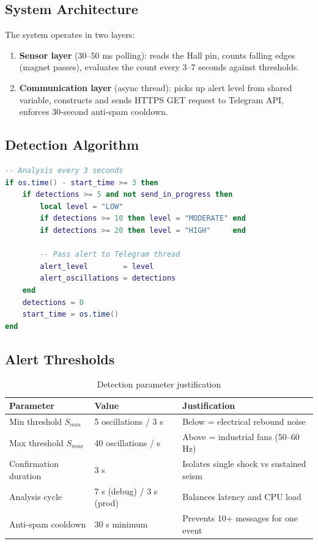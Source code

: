 \documentclass[11pt,a4paper]{article}
\begin{document}
\subsection{System Architecture}

The system operates in two layers:

\begin{enumerate}[noitemsep]
  \item \textbf{Sensor layer} (30--50 ms polling): reads the Hall pin, counts falling edges (magnet passes), evaluates the count every 3--7 seconds against thresholds.
  \item \textbf{Communication layer} (async thread): picks up alert level from shared variable, constructs and sends HTTPS GET request to Telegram API, enforces 30-second anti-spam cooldown.
\end{enumerate}

\subsection{Detection Algorithm}

\begin{lstlisting}[language=Lua, caption={Sensor thread core logic}]
-- Analysis every 3 seconds
if os.time() - start_time >= 3 then
    if detections >= 5 and not send_in_progress then
        local level = "LOW"
        if detections >= 10 then level = "MODERATE" end
        if detections >= 20 then level = "HIGH"     end

        -- Pass alert to Telegram thread
        alert_level        = level
        alert_oscillations = detections
    end
    detections = 0
    start_time = os.time()
end
\end{lstlisting}

\subsection{Alert Thresholds}

\begin{table}[h!]
\centering
\begin{tabular}{lll}
\toprule
\textbf{Parameter} & \textbf{Value} & \textbf{Justification} \\
\midrule
Min threshold $S_{min}$ & 5 oscillations / 3 s & Below = electrical rebound noise \\
Max threshold $S_{max}$ & 40 oscillations / s & Above = industrial fans (50--60 Hz) \\
Confirmation duration & 3 s & Isolates single shock vs sustained seism \\
Analysis cycle & 7 s (debug) / 3 s (prod) & Balances latency and CPU load \\
Anti-spam cooldown & 30 s minimum & Prevents 10+ messages for one event \\
\bottomrule
\end{tabular}
\caption{Detection parameter justification}
\end{table}
\end{document}
